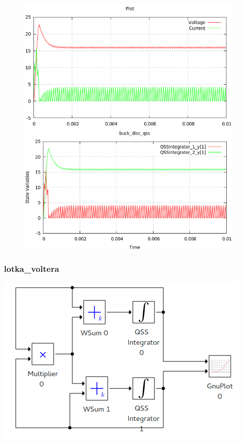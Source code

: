\documentclass[a4paper,	11pt]{report}
\begin{document}
\begin{figure}[H]
\centering
\begin{minipage}{0.5\textwidth}
\centering
 \includegraphics[width=\linewidth]{buck_disk-pd}
\end{minipage}\hfill
\begin{minipage}{0.5\textwidth}
\centering
 \includegraphics[width=\linewidth]{buck_disk-qss}
\end{minipage}
\end{figure}

\subsubsection{lotka\_voltera}

 \includegraphics[width=0.75\linewidth]{lotka_voltera_pwd}
\end{document}
